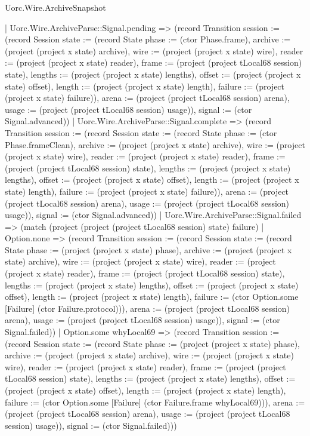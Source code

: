 \begin{lexlean}{Uorc.Wire.ArchiveSnapshot}
\begin{semanticmodule}
{      | Uorc.Wire.ArchiveParse::Signal.pending => (record Transition {session := (record Session {state := (record State {phase := (ctor Phase.frame), archive := (project (project x state) archive), wire := (project (project x state) wire), reader := (project (project x state) reader), frame := (project (project tLocal68 session) state), lengths := (project (project x state) lengths), offset := (project (project x state) offset), length := (project (project x state) length), failure := (project (project x state) failure)}), arena := (project (project tLocal68 session) arena), usage := (project (project tLocal68 session) usage)}), signal := (ctor Signal.advanced)})
      | Uorc.Wire.ArchiveParse::Signal.complete => (record Transition {session := (record Session {state := (record State {phase := (ctor Phase.frameClean), archive := (project (project x state) archive), wire := (project (project x state) wire), reader := (project (project x state) reader), frame := (project (project tLocal68 session) state), lengths := (project (project x state) lengths), offset := (project (project x state) offset), length := (project (project x state) length), failure := (project (project x state) failure)}), arena := (project (project tLocal68 session) arena), usage := (project (project tLocal68 session) usage)}), signal := (ctor Signal.advanced)})
      | Uorc.Wire.ArchiveParse::Signal.failed => (match (project (project (project tLocal68 session) state) failure)
        | Option.none => (record Transition {session := (record Session {state := (record State {phase := (project (project x state) phase), archive := (project (project x state) archive), wire := (project (project x state) wire), reader := (project (project x state) reader), frame := (project (project tLocal68 session) state), lengths := (project (project x state) lengths), offset := (project (project x state) offset), length := (project (project x state) length), failure := (ctor Option.some [Failure] (ctor Failure.protocol))}), arena := (project (project tLocal68 session) arena), usage := (project (project tLocal68 session) usage)}), signal := (ctor Signal.failed)})
        | Option.some whyLocal69 => (record Transition {session := (record Session {state := (record State {phase := (project (project x state) phase), archive := (project (project x state) archive), wire := (project (project x state) wire), reader := (project (project x state) reader), frame := (project (project tLocal68 session) state), lengths := (project (project x state) lengths), offset := (project (project x state) offset), length := (project (project x state) length), failure := (ctor Option.some [Failure] (ctor Failure.frame whyLocal69))}), arena := (project (project tLocal68 session) arena), usage := (project (project tLocal68 session) usage)}), signal := (ctor Signal.failed)}))
}
\end{semanticmodule}
\end{lexlean}
